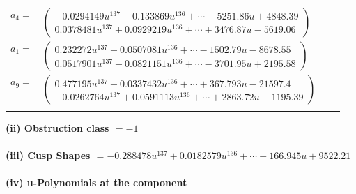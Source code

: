 \documentclass[1p]{elsarticle_modified}
\theoremstyle{definition}
\begin{document}
\begin{tabular}{m{7pt} m{180pt} m{7pt} m{180pt} }
\flushright $a_{4}=$&$\begin{pmatrix}-0.0294149 u^{137}-0.133869 u^{136}+\cdots-5251.86 u+4848.39\\0.0378481 u^{137}+0.0929219 u^{136}+\cdots+3476.87 u-5619.06\end{pmatrix}$ \\
\flushright $a_{1}=$&$\begin{pmatrix}0.232272 u^{137}-0.0507081 u^{136}+\cdots-1502.79 u-8678.55\\0.0517901 u^{137}-0.0821151 u^{136}+\cdots-3701.95 u+2195.58\end{pmatrix}$ \\
\flushright $a_{9}=$&$\begin{pmatrix}0.477195 u^{137}+0.0337432 u^{136}+\cdots+367.793 u-21597.4\\-0.0262764 u^{137}+0.0591113 u^{136}+\cdots+2863.72 u-1195.39\end{pmatrix}$\\&\end{tabular}
\flushleft \textbf{(ii) Obstruction class $= -1$}\\~\\
\flushleft \textbf{(iii) Cusp Shapes $= -0.288478 u^{137}+0.0182579 u^{136}+\cdots+166.945 u+9522.21$}\\~\\
\newpage\renewcommand{\arraystretch}{1}
\flushleft \textbf{(iv) u-Polynomials at the component}\newline \\
\end{document}

